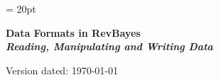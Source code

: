 \documentclass[11pt]{article}
\begin{document}
\renewcommand{\headrulewidth}{0.5pt}
\headsep = 20pt
\lhead{ }

\thispagestyle{plain}
\begin{center}

\textbf{\LARGE Data Formats in RevBayes}\\\vspace{2mm}
\textbf{\it{\Large Reading, Manipulating and Writing Data}}\\\vspace{2mm}
\end{center}

\def \ResourcePath {./}
\def \GlobalResourcePath {../}


Version dated: \today
\end{document}
